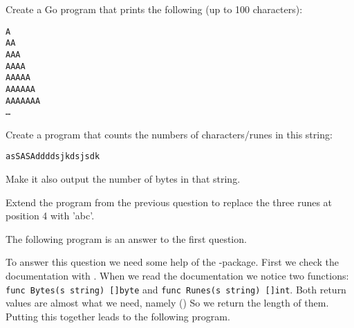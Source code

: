 \begin{Exercise}[title={Strings},difficulty=1]
\label{ex:strings}
\Question \label{ex:strings q1} Create a Go program that prints
the following (up to 100 characters):
\begin{alltt}
A
AA
AAA
AAAA
AAAAA
AAAAAA
AAAAAAA
\ldots
\end{alltt}


\Question \label{ex:strings q2} Create a program that counts
the numbers of characters/runes in this string:
\begin{alltt}
asSASA ddd dsjkdsjs dk
\end{alltt}
Make it also output the number of bytes in that string.

\Question \label{ex:string q3} Extend the program from
the previous question to replace the three runes at
position 4 with 'abc'.

\end{Exercise}

\begin{Answer}

\Question The following program is an answer to the first question.


\Question To answer this question we need some help of
the -package. First we check the documentation
with . When we read the documentation
we notice two functions: \lstinline{func Bytes(s string) []byte} and
\lstinline{func Runes(s string) []int}. Both return values are
almost what we need, namely () So we return the length of 
them. Putting this together leads to the following program.

\end{Answer}
